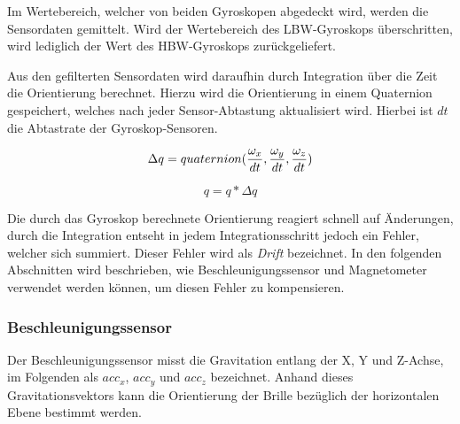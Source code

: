 Im Wertebereich, welcher von beiden Gyroskopen abgedeckt wird, werden
die Sensordaten gemittelt. Wird der Wertebereich des LBW-Gyroskops
überschritten, wird lediglich der Wert des HBW-Gyroskops
zurückgeliefert. 


Aus den gefilterten Sensordaten wird daraufhin durch Integration über
die Zeit die Orientierung berechnet. Hierzu wird die Orientierung in einem Quaternion gespeichert, welches nach jeder Sensor-Abtastung aktualisiert wird. Hierbei ist $dt$ die Abtastrate der Gyroskop-Sensoren.

\begin{equation}
    \Delta q = quaternion({\omega_x \over dt}, {\omega_y \over dt}, {\omega_z \over dt}) \\
\end{equation}

\begin{equation}
    q = q * \Delta q
\end{equation}

Die durch das Gyroskop berechnete Orientierung reagiert schnell auf
Änderungen, durch die Integration entseht in jedem Integrationsschritt jedoch ein Fehler, welcher sich summiert. Dieser Fehler wird als \emph{Drift} bezeichnet. In den folgenden Abschnitten wird beschrieben, wie Beschleunigungssensor und Magnetometer verwendet werden können, um diesen Fehler zu kompensieren.


\subsubsection{Beschleunigungssensor}

Der Beschleunigungssensor misst die Gravitation entlang der X, Y und Z-Achse, im Folgenden als $acc_x$, $acc_y$ und $acc_z$ bezeichnet. Anhand dieses Gravitationsvektors kann die Orientierung der Brille bezüglich der horizontalen Ebene bestimmt werden.

